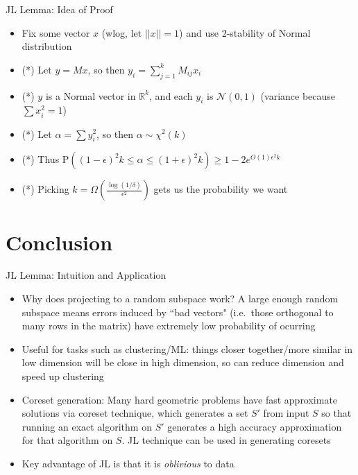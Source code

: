 \documentclass[aspectratio=169]{beamer}
\begin{document}
\begin{frame}{JL Lemma: Idea of Proof}
\protect\hypertarget{jl-lemma-idea-of-proof}{}
\begin{itemize}
\tightlist
\item
  Fix some vector \(x\) (wlog, let \(||x||=1\)) and use \(2\)-stability
  of Normal distribution \pause
\item
  (*) Let \(y = Mx\), so then \(y_i = \sum_{j=1}^k M_{ij} x_{i}\) \pause
\item
  (*) \(y\) is a Normal vector in \(\mathbb{R}^k\), and each \(y_i\) is
  \(\mathcal{N}(0,1)\) (variance because \(\sum x_i^2 = 1\)) \pause
\item
  (*) Let \(\alpha = \sum y_i^2\), so then \(\alpha \sim \chi^2 (k)\) \pause
\item
  (*) Thus
  \(\text{P}((1-\epsilon)^2 k \leq \alpha \leq (1+\epsilon)^2 k) \geq 1 - 2e^{O(1)\epsilon^2 k}\) \pause
\item
  (*) Picking \(k = \Omega\left(\frac{\log(1/\delta)}{\epsilon^2}\right)\)
  gets us the probability we want
\end{itemize}
\end{frame}

\section{Conclusion}

\frame{\sectionpage}

\begin{frame}{JL Lemma: Intuition and Application}
\protect\hypertarget{jl-lemma-intuition-and-application}{}
\begin{itemize}
\tightlist
\item
  Why does projecting to a random subspace work? A large enough random
  subspace means errors induced by ``bad vectors" (i.e.~those orthogonal
  to many rows in the matrix) have extremely low probability of ocurring \pause
\item
  Useful for tasks such as clustering/ML: things closer together/more
  similar in low dimension will be close in high dimension, so can
  reduce dimension and speed up clustering \pause
\item
  Coreset generation: Many hard geometric problems have fast approximate
  solutions via coreset technique, which generates a set \(S'\) from
  input \(S\) so that running an exact algorithm on \(S'\) generates a
  high accuracy approximation for that algorithm on \(S\). JL technique
  can be used in generating coresets \pause
\item
  Key advantage of JL is that it is \textit{oblivious} to data
\end{itemize}
\end{frame}
\end{document}
